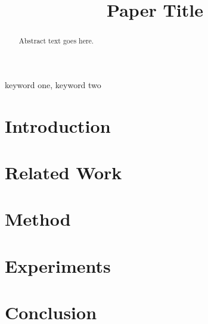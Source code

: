 \documentclass[conference]{IEEEtran}
\begin{document}
\title{Paper Title}

\author{
}

\maketitle

\begin{abstract}
Abstract text goes here.
\end{abstract}

\begin{IEEEkeywords}
keyword one, keyword two
\end{IEEEkeywords}

\section{Introduction}

\section{Related Work}

\section{Method}

\section{Experiments}

\section{Conclusion}



\end{document}
